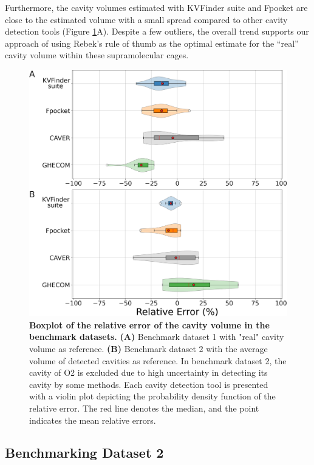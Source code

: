 \documentclass[Ingles]{phdthesis}
\begin{document}
Furthermore, the cavity volumes estimated with KVFinder suite and Fpocket are close to the estimated volume with a small spread compared to other cavity detection tools (Figure \ref{fig:re-plot-benchmarks}A). Despite a few outliers, the overall trend supports our approach of using Rebek's rule of thumb as the optimal estimate for the “real” cavity volume within these supramolecular cages.

\begin{figure}[ht]
  \centerline{\includegraphics[scale=0.9]{images/smc-re-plots.png}}
  \caption[Boxplot of the relative error of the cavity volume in the benchmark datasets]{\textbf{Boxplot of the relative error of the cavity volume in the benchmark datasets.}  \textbf{(A)} Benchmark dataset 1 with "real" cavity volume as reference. \textbf{(B)} Benchmark dataset 2 with the average volume of detected cavities as reference. In benchmark dataset 2, the cavity of O2 is excluded due to high uncertainty in detecting its cavity by some methods. Each cavity detection tool is presented with a violin plot depicting the probability density function of the relative error. The red line denotes the median, and the point indicates the mean relative errors.}
  \label{fig:re-plot-benchmarks}
\end{figure}

\subsection{Benchmarking Dataset 2}
\end{document}
